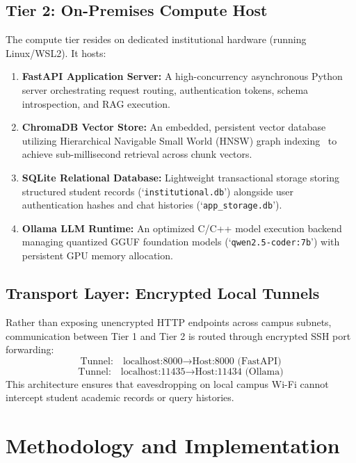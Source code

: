 \documentclass[conference]{IEEEtran}
\begin{document}
\subsection{Tier 2: On-Premises Compute Host}
The compute tier resides on dedicated institutional hardware (running Linux/WSL2). It hosts:
\begin{enumerate}
    \item \textbf{FastAPI Application Server:} A high-concurrency asynchronous Python server orchestrating request routing, authentication tokens, schema introspection, and RAG execution.
    \item \textbf{ChromaDB Vector Store:} An embedded, persistent vector database utilizing Hierarchical Navigable Small World (HNSW) graph indexing~\cite{malkov2018efficient} to achieve sub-millisecond retrieval across chunk vectors.
    \item \textbf{SQLite Relational Database:} Lightweight transactional storage storing structured student records (`\texttt{institutional.db}') alongside user authentication hashes and chat histories (`\texttt{app\_storage.db}').
    \item \textbf{Ollama LLM Runtime:} An optimized C/C++ model execution backend managing quantized GGUF foundation models (`\texttt{qwen2.5-coder:7b}') with persistent GPU memory allocation.
\end{enumerate}

\subsection{Transport Layer: Encrypted Local Tunnels}
Rather than exposing unencrypted HTTP endpoints across campus subnets, communication between Tier 1 and Tier 2 is routed through encrypted SSH port forwarding:
\begin{equation}
\text{Tunnel:} \quad \text{localhost:8000} \to \text{Host:8000 (FastAPI)}
\end{equation}
\begin{equation}
\text{Tunnel:} \quad \text{localhost:11435} \to \text{Host:11434 (Ollama)}
\end{equation}
This architecture ensures that eavesdropping on local campus Wi-Fi cannot intercept student academic records or query histories.

\section{Methodology and Implementation}
\end{document}

